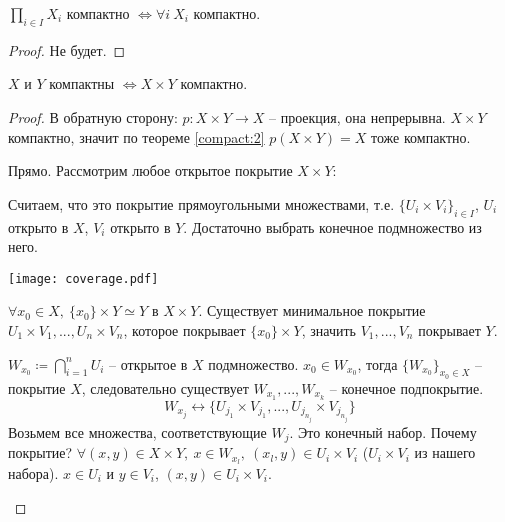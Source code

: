 \documentclass[main]{subfiles}
\begin{document}
\begin{theorem}[Тихонова]
    $\prod_{i \in I} X_i$ компактно $\Leftrightarrow \forall i\ X_i$ компактно.
\end{theorem}
\begin{proof}
    Не будет.
\end{proof}

\begin{theorem}\label{compact:3}
    $X$ и $Y$ компактны $\Leftrightarrow X \times Y$ компактно.
\end{theorem}
\begin{proof}
    В обратную сторону: $p: X\times Y \to X$ -- проекция, она непрерывна.
    $X\times Y$ компактно, значит по теореме \ref{compact:2} $p(X \times Y) = X$ тоже компактно.

    Прямо. Рассмотрим любое открытое покрытие $X \times Y$:
    \begin{enumerate}
        \begin{minipage}{0.45\textwidth}
            \item Считаем, что это покрытие прямоугольными множествами, т.е. $\{U_i \times V_i\}_{i \in I}$,
            $U_i$ открыто в $X$, $V_i$ открыто в $Y$.
            Достаточно выбрать конечное подмножество из него.
        \end{minipage}
        \begin{minipage}{0.45\textwidth}
            \texttt{[image: coverage.pdf]}
        \end{minipage}
        \item $\forall x_0 \in X,\ \{x_0\}\times Y \simeq Y$ в $X\times Y$.
              Существует минимальное покрытие $U_1 \times V_1, ..., U_n \times V_n$, которое покрывает $\{x_0\} \times Y$,
              значить $V_1, ..., V_n$ покрывает $Y$.

              $W_{x_0} \coloneqq \bigcap_{i=1}^n U_i$ -- открытое в $X$ подмножество.
              $x_0 \in W_{x_0}$, тогда $\{W_{x_0}\}_{x_0 \in X}$ -- покрытие $X$, следовательно существует $W_{x_1}, ..., W_{x_k}$ -- конечное подпокрытие.
              \[W_{x_j} \leftrightarrow \{U_{j_1} \times V_{j_1}, ..., U_{j_{n_j}} \times V_{j_{n_j}}\}\]
              Возьмем все множества, соответствующие $W_j$. Это конечный набор. Почему покрытие?
              $\forall (x,y) \in X \times Y,\ x\in W_{x_l},\ (x_l, y) \in U_i \times V_i$
              ($U_i \times V_i$ из нашего набора). $x \in U_i$ и $y \in V_i$, $(x,y) \in U_i \times V_i$. \qedhere
    \end{enumerate}
\end{proof}
\end{document}

